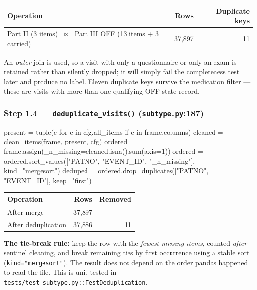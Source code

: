\documentclass[11pt,a4paper]{article}
\newcommand{\code}[1]{\texttt{\small #1}}
\begin{document}
\begin{table}[h]
\centering
\begin{tabular}{@{}lrr@{}}
\toprule
\textbf{Operation} & \textbf{Rows} & \textbf{Duplicate keys} \\
\midrule
Part II (3 items) $\;\bowtie\;$ Part III OFF (13 items + 3 carried) & 37{,}897 & 11 \\
\bottomrule
\end{tabular}
\end{table}

\noindent
An \emph{outer} join is used, so a visit with only a questionnaire or only an
exam is retained rather than silently dropped; it will simply fail the
completeness test later and produce no label. Eleven duplicate keys survive the
medication filter --- these are visits with more than one qualifying OFF-state
record.

\subsubsection*{Step 1.4 --- \code{deduplicate\_visits()} \quad (\code{subtype.py}:187)}

\begin{codeblock}
present = tuple(c for c in cfg.all_items if c in frame.columns)
cleaned = clean_items(frame, present, cfg)
ordered = frame.assign(_n_missing=cleaned.isna().sum(axis=1))
ordered = ordered.sort_values(["PATNO", "EVENT_ID", "_n_missing"], kind="mergesort")
deduped = ordered.drop_duplicates(["PATNO", "EVENT_ID"], keep="first")
\end{codeblock}

\begin{table}[h]
\centering
\begin{tabular}{@{}lrr@{}}
\toprule
\textbf{Operation} & \textbf{Rows} & \textbf{Removed} \\
\midrule
After merge            & 37{,}897 & --- \\
After deduplication    & 37{,}886 & 11 \\
\bottomrule
\end{tabular}
\end{table}

\noindent
\textbf{The tie-break rule:} keep the row with the \emph{fewest missing items},
counted \emph{after} sentinel cleaning, and break remaining ties by first
occurrence using a stable sort (\code{kind="mergesort"}). The result does not
depend on the order pandas happened to read the file. This is unit-tested in
\code{tests/test\_subtype.py::TestDeduplication}.
\end{document}
